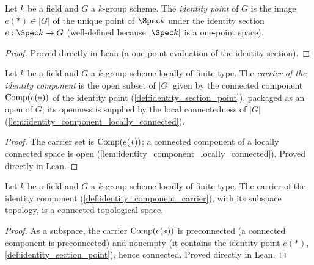 \begin{definition}

  \label{def:identity_section_point}
  Let \(k\) be a field and \(G\) a \(k\)-group scheme. The
  \emph{identity point} of \(G\) is the image \(e(\ast) \in |G|\) of the
  unique point of \(\Spec k\) under the identity section
  \(e : \Spec k \to G\) (well-defined because \(|\Spec k|\) is a
  one-point space).
\end{definition}
\begin{proof}
  Proved directly in Lean (a one-point evaluation of the identity
  section).
\end{proof}

\begin{definition}

  \label{def:identity_component_carrier}
  Let \(k\) be a field and \(G\) a \(k\)-group scheme locally of finite
  type. The \emph{carrier of the identity component} is the open subset of
  \(|G|\) given by the connected component
  \(\operatorname{Comp}(e(\ast))\) of the identity point
  (\cref{def:identity_section_point}), packaged as an open of \(G\); its
  openness is supplied by the local connectedness of \(|G|\)
  (\cref{lem:identity_component_locally_connected}).
\end{definition}
\begin{proof}
  The carrier set is \(\operatorname{Comp}(e(\ast))\); a connected component of a
  locally connected space is open
  (\cref{lem:identity_component_locally_connected}). Proved directly in
  Lean.
\end{proof}

\begin{lemma}

  \label{lem:identity_component_carrier_connected}
  Let \(k\) be a field and \(G\) a \(k\)-group scheme locally of finite
  type. The carrier of the identity component
  (\cref{def:identity_component_carrier}), with its subspace topology, is a
  connected topological space.
\end{lemma}
\begin{proof}
  As a subspace, the carrier \(\operatorname{Comp}(e(\ast))\) is preconnected (a
  connected component is preconnected) and nonempty (it contains the
  identity point \(e(\ast)\), \cref{def:identity_section_point}), hence
  connected. Proved directly in Lean.
\end{proof}

